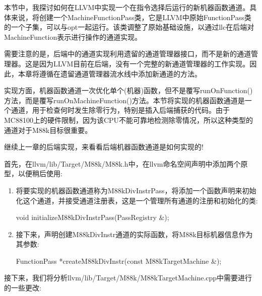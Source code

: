 
本节中，我探讨如何在LLVM中实现一个在指令选择后运行的新机器函数通道。具体来说，将创建一个MachineFunctionPass类，它是LLVM中原始FunctionPass类的一个子集，可以与opt一起运行。该类调整了原始基础设施，以通过llc在后端对MachineFunction表示进行操作的通道实现。

需要注意的是，后端中的通道实现利用遗留的通道管理器接口，而不是新的通道管理器。这是因为LLVM目前在后端，没有一个完整的新通道管理器的工作实现。因此，本章将遵循在遗留通道管理器流水线中添加新通道的方法。

实现方面，机器函数通道一次优化单个(机器)函数，但不是覆写runOnFunction()方法，而是覆写runOnMachineFunction()方法。本节将实现的机器函数通道是一个通道，用于检查何时发生除零行为，特别是插入后端捕获的代码。由于MC88100上的硬件限制，因为该CPU不能可靠地检测除零情况，所以这种类型的通道对于M88k目标很重要。

继续上一章的后端实现，来看看后端机器函数通道是如何实现的!


首先，在llvm/lib/Target/M88k/M88k.h中，在llvm命名空间声明中添加两个原型，以便稍后使用:

\begin{enumerate}
\item
将要实现的机器函数通道称为M88kDivInstrPass，将添加一个函数声明来初始化这个通道，并接受通道注册表，这是一个管理所有通道的注册和初始化的类:

\begin{cpp}
void initializeM88kDivInstrPass(PassRegistry &);
\end{cpp}

\item
接下来，声明创建M88kDivInstr通道的实际函数，将M88k目标机器信息作为其参数:

\begin{cpp}
FunctionPass *createM88kDivInstr(const M88kTargetMachine &);
\end{cpp}
\end{enumerate}


接下来，我们将分析llvm/lib/Target/M88k/M88kTargetMachine.cpp中需要进行的一些更改:

